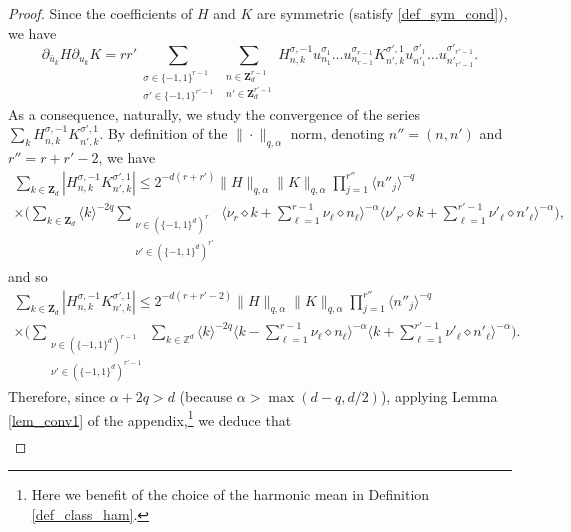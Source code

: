 \documentclass[JEP,XML,SOM,Unicode,NoEqCountersInSection,published]{cedram}
\theoremstyle{definition}
\begin{document}
\begin{proof}
Since the coefficients of $H$ and $K$ are symmetric (\ie satisfy \eqref{def_sym_cond}), we have
\begin{equation}
\label{eq_a_tue_un_chasseur}
\partial_{\bar{u}_k} H \partial_{u_k} K = r r' \sum_{\substack{\sigma \in \{-1,1\}^{r-1}\\ \sigma' \in \{-1,1\}^{r'-1} }} \sum_{\substack{n\in \mathbf{Z}_d^{r-1} \\ n'\in \mathbf{Z}_d^{r'-1} }} H_{n,k}^{\sigma,-1} u_{n_1}^{\sigma_1} \dots u_{n_{r-1}}^{\sigma_{r-1}} K_{n',k}^{\sigma',1} u_{n'_1}^{\sigma'_1} \dots u_{n'_{r'-1}}^{\sigma'_{r'-1}}.
\end{equation}
As a consequence, naturally, we study the convergence of the series $\sum_k H_{n,k}^{\sigma,-1} K_{n',k}^{\sigma',1}$. By definition of the $\| \cdot \|_{q,\alpha}$ norm, denoting $n''=(n,n')$ and $r''=r+r'-2$, we have
\begin{multline*}
\sum_{k\in \mathbf{Z}_d}|H_{n,k}^{\sigma,-1} K_{n',k}^{\sigma',1}| \leq 2^{-d(r+r')} \| H \|_{q,\alpha} \|K \|_{q,\alpha}\prod_{j=1}^{r''}\langle n''_j \rangle^{-q} \\
\times \biggl(\sum_{k\in \mathbf{Z}_d} \langle k \rangle^{-2q} \sum_{\substack{\nu \in (\{-1,1\}^d)^r \\ \nu' \in (\{-1,1\}^d)^{r'} } } \big\langle \nu_{r} \diamond k + \sum_{\ell =1}^{r-1} \nu_{\ell} \diamond n_{\ell} \big\rangle^{-\alpha} \big\langle \nu'_{r'} \diamond k + \sum_{\ell =1}^{r'-1} \nu'_{\ell} \diamond n'_{\ell} \big\rangle^{-\alpha} \biggr),
\end{multline*}
and so
\begin{multline*}
\sum_{k\in \mathbf{Z}_d}|H_{n,k}^{\sigma,-1} K_{n',k}^{\sigma',1}| \leq 2^{-d(r+r'-2)} \| H \|_{q,\alpha} \|K \|_{q,\alpha}\prod_{j=1}^{r''} \langle n''_j \rangle^{-q} \\
\times \biggl(\sum_{\substack{\nu \in (\{-1,1\}^d)^{r-1} \\ \nu' \in (\{-1,1\}^d)^{r'-1} } } \sum_{k\in \mathbb{Z}^d} \langle k \rangle^{-2q} \big\langle k - \sum_{\ell =1}^{r-1} \nu_{\ell} \diamond n_{\ell} \big\rangle^{-\alpha} \big\langle k + \sum_{\ell =1}^{r'-1} \nu'_{\ell} \diamond n'_{\ell} \big\rangle^{-\alpha} \biggr).
\end{multline*}
Therefore, since $\alpha+2q>d$ (because $\alpha>\max(d-q,d/2)$), applying Lemma \ref{lem_conv1} of the appendix,\footnote{Here we benefit of the choice of the harmonic mean in Definition \ref{def_class_ham}.} we deduce that
\begin{multline}
\label{eq_lugaru}

\end{multline}
\end{proof}
\end{document}
